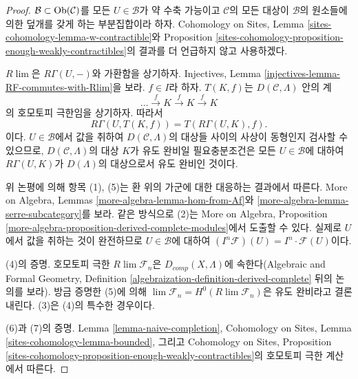 \begin{proof}
$\mathcal{B} \subset \mathop{\mathrm{Ob}}\nolimits(\mathcal{C})$를 모든 $U \in \mathcal{B}$가
약 수축 가능이고 $\mathcal{C}$의 모든 대상이 $\mathcal{B}$의
원소들에 의한 덮개를 갖게 하는 부분집합이라 하자. Cohomology on Sites,
Lemma \ref{sites-cohomology-lemma-w-contractible}와 Proposition
\ref{sites-cohomology-proposition-enough-weakly-contractibles}의 결과를
더 언급하지 않고 사용하겠다.

\medskip\noindent
$R\lim$은 $R\Gamma(U, -)$와 가환함을 상기하자. Injectives, Lemma
\ref{injectives-lemma-RF-commutes-with-Rlim}을 보라. $f \in I$라 하자.
$T(K, f)$는 $D(\mathcal{C}, \Lambda)$ 안의 계
$$
\ldots \xrightarrow{f} K \xrightarrow{f} K \xrightarrow{f} K
$$
의 호모토피 극한임을 상기하자. 따라서
$$
R\Gamma(U, T(K, f)) = T(R\Gamma(U, K), f).
$$
이다. $U \in \mathcal{B}$에서 값을 취하여
$D(\mathcal{C}, \Lambda)$의 대상들 사이의 사상이 동형인지 검사할 수
있으므로, $D(\mathcal{C}, \Lambda)$의 대상 $K$가 유도 완비일
필요충분조건은 모든 $U \in \mathcal{B}$에 대하여
$R\Gamma(U, K)$가 $D(\Lambda)$의 대상으로서 유도 완비인 것이다.

\medskip\noindent
위 논평에 의해 항목 (1), (5)는 환 위의 가군에 대한 대응하는 결과에서
따른다. More on Algebra, Lemmas
\ref{more-algebra-lemma-hom-from-Af}와
\ref{more-algebra-lemma-serre-subcategory}를 보라. 같은 방식으로 (2)는
More on Algebra, Proposition
\ref{more-algebra-proposition-derived-complete-modules}에서 도출할 수 있다.
실제로 $U$에서 값을 취하는 것이 완전하므로 $U \in \mathcal{B}$에
대하여 $(I^n\mathcal{F})(U) = I^n \cdot \mathcal{F}(U)$이다.

\medskip\noindent
(4)의 증명. 호모토피 극한 $R\lim \mathcal{F}_n$은
$D_{comp}(X, \Lambda)$에 속한다(Algebraic and Formal Geometry,
Definition \ref{algebraization-definition-derived-complete} 뒤의 논의를
보라). 방금 증명한 (5)에 의해
$\lim \mathcal{F}_n = H^0(R\lim \mathcal{F}_n)$은 유도 완비라고
결론내린다. (3)은 (4)의 특수한 경우이다.

\medskip\noindent
(6)과 (7)의 증명. Lemma \ref{lemma-naive-completion}, Cohomology on
Sites, Lemma \ref{sites-cohomology-lemma-bounded}, 그리고 Cohomology on
Sites, Proposition
\ref{sites-cohomology-proposition-enough-weakly-contractibles}의 호모토피
극한 계산에서 따른다.
\end{proof}







